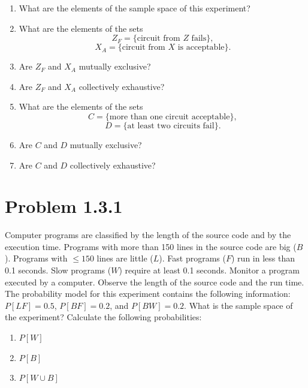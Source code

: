\documentclass{article}
\begin{document}
\begin{enumerate}[label=(\alph*)]
    \item What are the elements of the sample space of this experiment?
    \vspace{1.5in}
    \item What are the elements of the sets
    \[ Z_F = \{ \text{circuit from } Z \text{ fails} \}, \]
    \[ X_A = \{ \text{circuit from } X \text{ is acceptable} \}. \]
    \vspace{1.5in}
    \item Are $Z_F$ and $X_A$ mutually exclusive?
    \vspace{1.5in}
    \item Are $Z_F$ and $X_A$ collectively exhaustive?
    \vspace{1.5in}
    \item What are the elements of the sets
    \[ C = \{ \text{more than one circuit acceptable} \}, \]
    \[ D = \{ \text{at least two circuits fail} \}. \]
    \vspace{1.5in}
    \item Are $C$ and $D$ mutually exclusive?
    \vspace{1.5in}
    \item Are $C$ and $D$ collectively exhaustive?
    \vspace{1.5in}
\end{enumerate}

\newpage

\section*{Problem 1.3.1}
Computer programs are classified by the length of the source code and by the execution time. Programs with more than 150 lines in the source code are big ($B$). Programs with $\le 150$ lines are little ($L$). Fast programs ($F$) run in less than 0.1 seconds. Slow programs ($W$) require at least 0.1 seconds. Monitor a program executed by a computer. Observe the length of the source code and the run time. The probability model for this experiment contains the following information: $P[LF] = 0.5$, $P[BF] = 0.2$, and $P[BW] = 0.2$. What is the sample space of the experiment? Calculate the following probabilities:

\begin{enumerate}[label=(\alph*)]
    \item $P[W]$
    \vspace{1.5in}
    \item $P[B]$
    \vspace{1.5in}
    \item $P[W \cup B]$
    \vspace{1.5in}
\end{enumerate}
\end{document}
